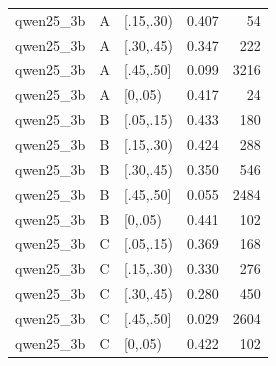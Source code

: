 \begin{tabular}{lllrr}
qwen25\_3b & A & [.15,.30) & 0.407 & 54 \\
qwen25\_3b & A & [.30,.45) & 0.347 & 222 \\
qwen25\_3b & A & [.45,.50] & 0.099 & 3216 \\
qwen25\_3b & A & [0,.05) & 0.417 & 24 \\
qwen25\_3b & B & [.05,.15) & 0.433 & 180 \\
qwen25\_3b & B & [.15,.30) & 0.424 & 288 \\
qwen25\_3b & B & [.30,.45) & 0.350 & 546 \\
qwen25\_3b & B & [.45,.50] & 0.055 & 2484 \\
qwen25\_3b & B & [0,.05) & 0.441 & 102 \\
qwen25\_3b & C & [.05,.15) & 0.369 & 168 \\
qwen25\_3b & C & [.15,.30) & 0.330 & 276 \\
qwen25\_3b & C & [.30,.45) & 0.280 & 450 \\
qwen25\_3b & C & [.45,.50] & 0.029 & 2604 \\
qwen25\_3b & C & [0,.05) & 0.422 & 102 \\
\bottomrule
\end{tabular}
